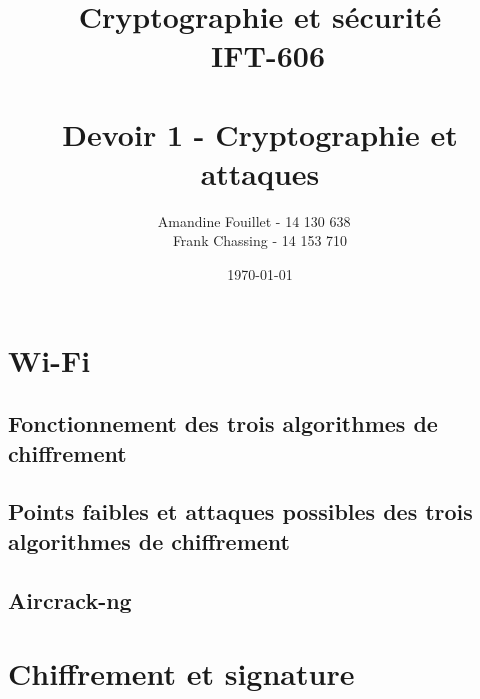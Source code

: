 \documentclass[11pt]{article}
\title{\vspace{\fill} Cryptographie et sécurité \\ ~\textbf{IFT-606} \\~\\ Devoir 1 - Cryptographie et attaques}
\author{Amandine Fouillet - 14 130 638 ~\\ Frank Chassing - 14 153 710}
\date{\today \vspace{\fill}}
\begin{document}
\maketitle
\newpage \thispagestyle{empty}
\null
\newpage
\tableofcontents
\listoffigures
\newpage
\section{Wi-Fi}
\subsection{Fonctionnement des trois algorithmes de chiffrement}
\subsection{Points faibles et attaques possibles des trois algorithmes de chiffrement}
\subsection{Aircrack-ng}
\newpage
\section{Chiffrement et signature}
\end{document}
